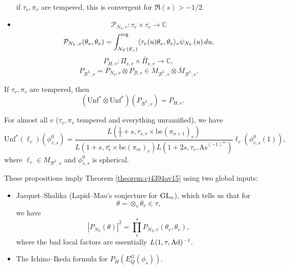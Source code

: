 \documentclass[reqno]{amsart} 
\begin{document}
\begin{remark}
\begin{itemize}
    if $\tau_v, \pi_v$ are tempered, this is convergent for $\Re(s) > -1/2$.
  \item
    \begin{equation*}
      \mathcal{P}_{N_Y, v} : \tau_v \times \overline{\tau_v } \rightarrow \mathbb{C} 
    \end{equation*}
    \begin{equation*}
      \mathcal{P}_{N_Y, v} (\theta_v, \theta_v ) = \int_{N_Y (F_v )}^{\operatorname{reg}} \langle \tau_v (u) \theta_v, \theta_v  \rangle_v  \psi_{N_Y } (u ) \, d u,
    \end{equation*}
    \begin{equation*}
      P_{H, v} : \Pi_{s, v} \times \bar{\Pi }_{s , v } \rightarrow \mathbb{C},
    \end{equation*}
    \begin{equation*}
      P_{\mathcal{B}^L, v} = P_{N_Y, v} \otimes P_{\mathcal{B}, v} \in M_{\mathcal{B}^L, v}
      \otimes \overline{M}_{\mathcal{B}^L, v}.
    \end{equation*}
  \end{itemize}
\end{remark}

\begin{proposition}  If $\tau_v, \pi_v$ are tempered, then\label{proposition:cj4460mf82}
  \begin{equation*}
\left( \mathrm{Unf}^\ast \otimes \mathrm{Unf}^\ast  \right) \left( P_{\mathcal{B}^L, v} \right) = P_{H, v}.
\end{equation*}
\end{proposition}

\begin{proposition}\label{proposition:cj4460mdxp}
  For almost all $v$ ($\tau_v, \pi_v$ tempered and everything unramified), we have
  \begin{equation*}
    \mathrm{Unf}^\ast (\ell_v) (\phi_{v,s}^0 ) =
    \frac{L (\frac{1}{2} + s, \tau_{s, v} \times \mathrm{bc} (\pi_{n + 1})_v)}{
      L (1 + s, \tau_v^c \times \mathrm{bc} (\pi_m )_{v})
      L (1 + 2 s, \tau_v, \mathrm{As}^{(- 1)^m })
    }
    \ell_v (\phi_{v, s}^0 (1)),
  \end{equation*}
  where $\ell_v \in M_{\mathcal{B}^L, v}$ and $\phi_{v, s}^0 $ is spherical.
\end{proposition}
These propositions imply Theorem \ref{theorem:cj4394av15} using two global inputs:
\begin{itemize}
\item Jacquet--Shalika (Lapid--Mao's conjecture for $\operatorname{GL}_n$), which tells us that for
  \begin{equation*}
\theta = \otimes_v \theta_v \in \tau, 
  \end{equation*}
  we have
  \begin{equation*}
    \left\lvert P_{N_Y } (\theta)  \right\rvert^2 = \prod_v^\ast P_{N_Y , v}
    (\theta_v, \theta_v ),
  \end{equation*}
  where the bad local factors are essentially $L (1, \tau, \operatorname{Ad})^{-1}$.
\item The Ichino--Ikeda formula for $P_H (E_Q^G (\phi_s ))$.
\end{itemize}
\end{document}
